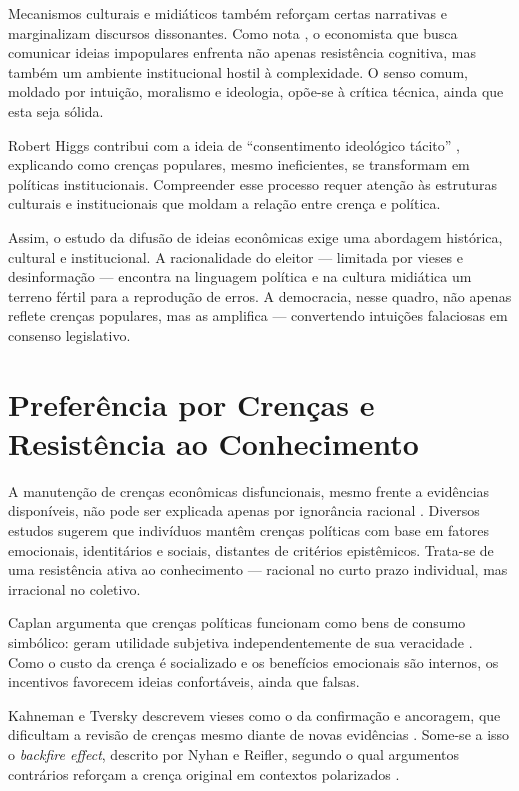 Mecanismos culturais e midiáticos também reforçam certas narrativas e marginalizam discursos dissonantes. Como nota , o economista que busca comunicar ideias impopulares enfrenta não apenas resistência cognitiva, mas também um ambiente institucional hostil à complexidade. O senso comum, moldado por intuição, moralismo e ideologia, opõe-se à crítica técnica, ainda que esta seja sólida.

Robert Higgs contribui com a ideia de ``consentimento ideológico tácito'' \cite{higgs1987crisis}, explicando como crenças populares, mesmo ineficientes, se transformam em políticas institucionais. Compreender esse processo requer atenção às estruturas culturais e institucionais que moldam a relação entre crença e política.

Assim, o estudo da difusão de ideias econômicas exige uma abordagem histórica, cultural e institucional. A racionalidade do eleitor — limitada por vieses e desinformação — encontra na linguagem política e na cultura midiática um terreno fértil para a reprodução de erros. A democracia, nesse quadro, não apenas reflete crenças populares, mas as amplifica — convertendo intuições falaciosas em consenso legislativo.


\section{Preferência por Crenças e Resistência ao Conhecimento}

A manutenção de crenças econômicas disfuncionais, mesmo frente a evidências disponíveis, não pode ser explicada apenas por ignorância racional \cite{downs1957economic}. Diversos estudos sugerem que indivíduos mantêm crenças políticas com base em fatores emocionais, identitários e sociais, distantes de critérios epistêmicos. Trata-se de uma resistência ativa ao conhecimento — racional no curto prazo individual, mas irracional no coletivo.

Caplan argumenta que crenças políticas funcionam como bens de consumo simbólico: geram utilidade subjetiva independentemente de sua veracidade \cite{The_Myth_of_the_Rational_Voter}. Como o custo da crença é socializado e os benefícios emocionais são internos, os incentivos favorecem ideias confortáveis, ainda que falsas.

Kahneman e Tversky descrevem vieses como o da confirmação e ancoragem, que dificultam a revisão de crenças mesmo diante de novas evidências \cite{kahneman2011thinking}. Some-se a isso o \textit{backfire effect}, descrito por Nyhan e Reifler, segundo o qual argumentos contrários reforçam a crença original em contextos polarizados \cite{nyhan2010when}.

